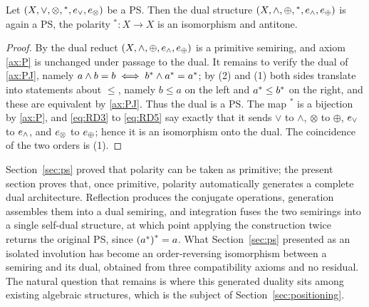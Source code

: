 \begin{theorem}\label{thm:fundamental}
Let $(X,\vee,\otimes,{}^{*},e_{\vee},e_{\otimes})$ be a PS. Then the dual structure
$(X,\wedge,\oplus,{}^{*},e_{\wedge},e_{\oplus})$ is again a PS, the polarity
${}^{*}\colon X \to X$ is an isomorphism and antitone.
\end{theorem}

\begin{proof}
By  the dual reduct $(X,\wedge,\oplus,e_{\wedge},e_{\oplus})$ is a
primitive semiring, and axiom \eqref{ax:P} is unchanged under passage to the
dual. It remains to verify the dual of \eqref{ax:PJ}, namely
$a \wedge b = b \iff {b}^{*} \wedge {a}^{*} = {a}^{*}$; by
(2) and (1) both sides
translate into statements about $\leq$, namely $b \leq a$ on the left and
${a}^{*} \leq {b}^{*}$ on the right, and these are equivalent by
\eqref{ax:PJ}. Thus the dual is a PS. The map ${}^{*}$ is a bijection by
\eqref{ax:P}, and \eqref{eq:RD3} to \eqref{eq:RD5} say exactly that it sends
$\vee$ to $\wedge$, $\otimes$ to $\oplus$, $e_{\vee}$ to $e_{\wedge}$, and $e_{\otimes}$ to
$e_{\oplus}$; hence it is an isomorphism onto the dual. The coincidence of the two
orders is (1).
\end{proof}

Section~\ref{sec:ps} proved that polarity can be taken as primitive; the
present section proves that, once primitive, polarity automatically generates
a complete dual architecture. Reflection produces the conjugate operations,
generation assembles them into a dual semiring, and integration fuses the two
semirings into a single self-dual structure, at which point applying the
construction twice returns the original PS, since ${({a}^{*})}^{*} = a$.
What Section~\ref{sec:ps} presented as an isolated involution has become an
order-reversing isomorphism between a semiring and its dual, obtained from
three compatibility axioms and no residual. The natural question that remains
is where this generated duality sits among existing algebraic structures,
which is the subject of Section~\ref{sec:positioning}.


